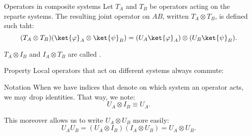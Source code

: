 \documentclass[a4paper]{article}
\begin{document}
\begin{parag}{Operators in composite systems}
    Let $T_A$ and $T_B$ be operators acting on the reparte systems. The resulting joint operator on $AB$, written $T_A \otimes T_B$, is defined such taht: 
    \[\left(T_A \otimes T_B\right) \left(\ket{\phi}_A \otimes \ket{\psi}_B\right) = \left(U_A \ket{\phi}_A\right) \otimes \left(U_B \ket{\psi}_B\right).\]

    $T_A \otimes I_B$ and $I_A \otimes T_B$ are called . 

    \begin{subparag}{Property}
        Local operators that act on different systems always commute: 
    \end{subparag}
    
    \begin{subparag}{Notation}
        When we have indices that denote on which system an operator acts, we may drop identities. That way, we note: 
        \[U_A \otimes I_B \equiv U_A.\]

        This moreover allows us to write $U_A \otimes U_B$ more easily: 
        \[U_A U_B = \left(U_A \otimes I_B\right) \left(I_A \otimes U_B\right) = U_A \otimes U_B.\]
    \end{subparag}
\end{parag}
\end{document}

